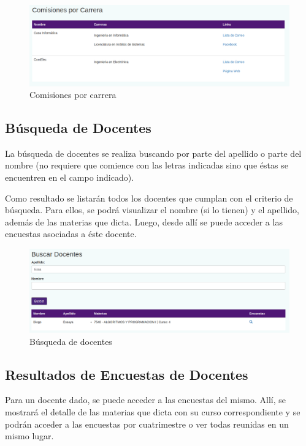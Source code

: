 \documentclass[a4paper]{article}
\begin{document}
\begin{figure}[H]
\centering
\includegraphics[scale=0.3]{Imagenes/comisiones.png}\par
\caption{Comisiones por carrera}
\end{figure}

\subsection{Búsqueda de Docentes}

La búsqueda de docentes se realiza buscando por parte del apellido o parte del nombre (no requiere que comience con las letras indicadas sino que éstas se encuentren en el campo indicado).

Como resultado se listarán todos los docentes que cumplan con el criterio de búsqueda. Para ellos, se podrá visualizar el nombre (si lo tienen) y el apellido, además de las materias que dicta. Luego, desde allí se puede acceder a las encuestas asociadas a éste docente.

\begin{figure}[H]
\centering
\includegraphics[scale=0.3]{Imagenes/buscar_docentes.png}\par
\caption{Búsqueda de docentes}
\end{figure}

\subsection{Resultados de Encuestas de Docentes}

Para un docente dado, se puede acceder a las encuestas del mismo. Allí, se mostrará el detalle de las materias que dicta con su curso correspondiente y se podrán acceder a las encuestas por cuatrimestre o ver todas reunidas en un mismo lugar.
\end{document}
